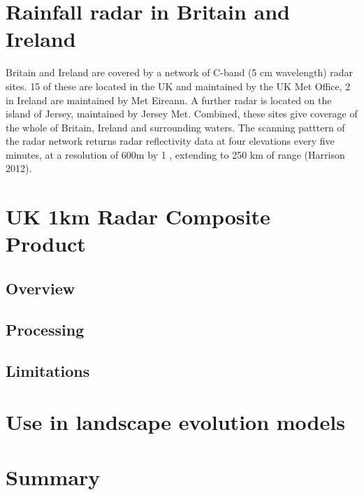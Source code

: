 \section{Rainfall radar in Britain and Ireland}

Britain and Ireland are covered by a network of C-band (5 cm wavelength) radar sites. 15 of these are located in the UK and maintained by the UK Met Office, 2 in Ireland are maintained by Met Eireann. A further radar is located on the island of Jersey, maintained by Jersey Met. Combined, these sites give coverage of the whole of Britain, Ireland and surrounding waters. The scanning patttern of the radar network returns radar reflectivity data at four elevations every five minutes, at a resolution of 600m by 1 \degree, extending to 250 km of range (Harrison 2012). 


\section{UK 1km Radar Composite Product}
\label{NIMROD}

\subsection{Overview}

\subsection{Processing}

\subsection{Limitations}

\section{Use in landscape evolution models}

\section{Summary}

